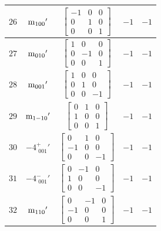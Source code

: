 \documentclass[fleqn,8pt]{jsarticle}
\begin{document}
\begin{longtable}{ccccc}
$ 26 $ & $ {\rm m}_{100}{}' $ & $ \begin{bmatrix} -1 & 0 & 0 \\ 0 & 1 & 0 \\ 0 & 0 & 1 \end{bmatrix} $ & $ -1 $ & $ -1 $ \\ \hline
$ 27 $ & $ {\rm m}_{010}{}' $ & $ \begin{bmatrix} 1 & 0 & 0 \\ 0 & -1 & 0 \\ 0 & 0 & 1 \end{bmatrix} $ & $ -1 $ & $ -1 $ \\ \hline
$ 28 $ & $ {\rm m}_{001}{}' $ & $ \begin{bmatrix} 1 & 0 & 0 \\ 0 & 1 & 0 \\ 0 & 0 & -1 \end{bmatrix} $ & $ -1 $ & $ -1 $ \\ \hline
$ 29 $ & $ {\rm m}_{1-10}{}' $ & $ \begin{bmatrix} 0 & 1 & 0 \\ 1 & 0 & 0 \\ 0 & 0 & 1 \end{bmatrix} $ & $ -1 $ & $ -1 $ \\ \hline
$ 30 $ & $ -4^{+}_{\,\,001}{}' $ & $ \begin{bmatrix} 0 & 1 & 0 \\ -1 & 0 & 0 \\ 0 & 0 & -1 \end{bmatrix} $ & $ -1 $ & $ -1 $ \\ \hline
$ 31 $ & $ -4^{-}_{\,\,001}{}' $ & $ \begin{bmatrix} 0 & -1 & 0 \\ 1 & 0 & 0 \\ 0 & 0 & -1 \end{bmatrix} $ & $ -1 $ & $ -1 $ \\ \hline
$ 32 $ & $ {\rm m}_{110}{}' $ & $ \begin{bmatrix} 0 & -1 & 0 \\ -1 & 0 & 0 \\ 0 & 0 & 1 \end{bmatrix} $ & $ -1 $ & $ -1 $ \\
\end{longtable}
\end{document}
